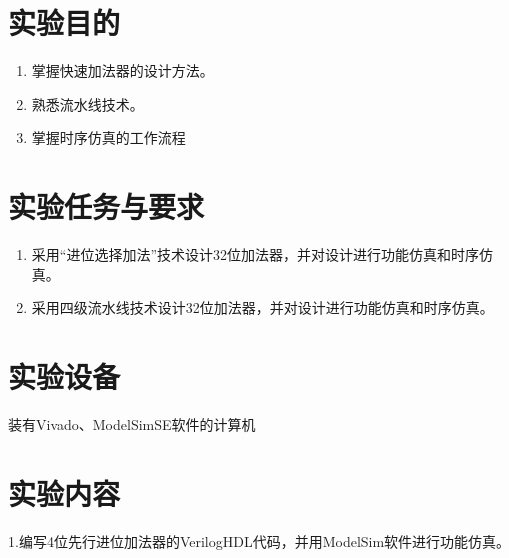 \documentclass[12pt,hyperref,a4paper,UTF8]{ctexart}
\begin{document}
\cover

%
%

\thispagestyle{empty} %

\newpage
\tableofcontents

\newpage


\section{实验目的}
\begin{enumerate}
  \item 掌握快速加法器的设计方法。
  \item 熟悉流水线技术。
  \item 掌握时序仿真的工作流程
\end{enumerate}




\section{实验任务与要求}

\begin{enumerate}
  \item 采用“进位选择加法”技术设计32位加法器，并对设计进行功能仿真和时序仿真。
\item 采用四级流水线技术设计32位加法器，并对设计进行功能仿真和时序仿真。
\end{enumerate}

\section{实验设备}
装有Vivado、ModelSimSE软件的计算机

\section{实验内容}

1.编写4位先行进位加法器的VerilogHDL代码，并用ModelSim软件进行功能仿真。
\end{document}
